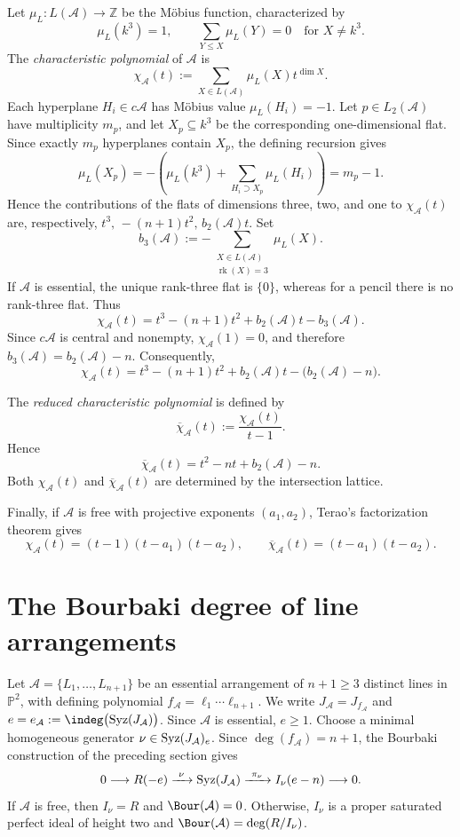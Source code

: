 \documentclass[11pt]{amsart}   %
\theoremstyle{definition}
\def\syz{\mbox{\rm Syz}}
\def\ZZ{{\bf Z}}
\def\NZQ{\mathbb}               %
\def\ZZ{{\NZQ Z}}
\def\PP{{\NZQ P}}
\def\A{{\mathcal A}}
\begin{document}
Let $\mu_L:L(\A)\to\ZZ$ be the M\"obius function, characterized by
\[
\mu_L(k^3)=1,
\qquad
\sum_{Y\leq X}\mu_L(Y)=0
\quad\text{for }X\neq k^3.
\]
The \emph{characteristic polynomial} of $\A$ is
\[
\chi_\A(t)
:=
\sum_{X\in L(\A)}\mu_L(X)t^{\dim X}.
\]
Each hyperplane $H_i\in c\A$ has M\"obius value $\mu_L(H_i)=-1$. Let $p\in L_2(\A)$ have multiplicity $m_p$, and let $X_p\subseteq k^3$ be the corresponding one-dimensional flat. Since exactly $m_p$ hyperplanes contain $X_p$, the defining recursion gives
\[
\mu_L(X_p)
=
-\left(
\mu_L(k^3)+\sum_{H_i\supset X_p}\mu_L(H_i)
\right)
=
m_p-1.
\]
Hence the contributions of the flats of dimensions three, two, and one to $\chi_\A(t)$ are, respectively, $t^3,\, -(n+1)t^2,\, b_2(\A)t$. Set
\[
b_3(\A)
:= -\sum_{\substack{X\in L(\A)\\ \operatorname{rk}(X)=3}}
\mu_L(X).
\]
If $\A$ is essential, the unique rank-three flat is $\{0\}$, whereas for a pencil there is no rank-three flat. Thus
\[
\chi_\A(t)
=
t^3-(n+1)t^2+b_2(\A)t-b_3(\A).
\]
Since $c\A$ is central and nonempty, $\chi_\A(1)=0$, and therefore $b_3(\A)=b_2(\A)-n.$ Consequently,
\[
\chi_\A(t)
=
t^3-(n+1)t^2+b_2(\A)t-\bigl(b_2(\A)-n\bigr).
\]

The \emph{reduced characteristic polynomial} is defined by
\[
\overline{\chi}_\A(t)
:=
\frac{\chi_\A(t)}{t-1}.
\]
Hence
\begin{equation}
\label{eq:reduced-characteristic-polynomial}
\overline{\chi}_\A(t)
=
t^2-nt+b_2(\A)-n.
\end{equation}
Both $\chi_\A(t)$ and $\overline{\chi}_\A(t)$ are determined by the intersection lattice.

Finally, if $\A$ is free with projective exponents $(a_1,a_2)$, Terao's factorization theorem \cite[Theorem~4.137]{Orlik-Terao} gives
\[
\chi_\A(t)
=
(t-1)(t-a_1)(t-a_2), \qquad
\overline{\chi}_\A(t)
=
(t-a_1)(t-a_2).
\]

\section{The Bourbaki degree of line arrangements}
\label{sec:bourbaki-degree-line-arrangements}

Let $\A=\{L_1,\ldots,L_{n+1}\}$ be an essential arrangement of $n+1\geq3$ distinct lines in $\PP^2$, with defining polynomial $f_\A=\ell_1\cdots\ell_{n+1}$. We write $J_\A=J_{f_\A}$ and $e=e_\A:=\indeg\bigl(\syz(J_\A)\bigr)$. Since $\A$ is essential, $e\geq1$. Choose a minimal homogeneous generator $\nu\in\syz(J_\A)_e$. Since $\deg(f_\A)=n+1$, the Bourbaki construction of the preceding section gives
\[
0\longrightarrow R(-e)\xrightarrow{\ \nu\ }\syz(J_\A)
\xrightarrow{\ \pi_\nu\ }I_\nu(e-n)\longrightarrow0.
\]
If $\A$ is free, then $I_\nu=R$ and $\Bour(\A)=0$. Otherwise, $I_\nu$ is a proper saturated perfect ideal of height two and $\Bour(\A)=\deg(R/I_\nu)$.
\end{document}
